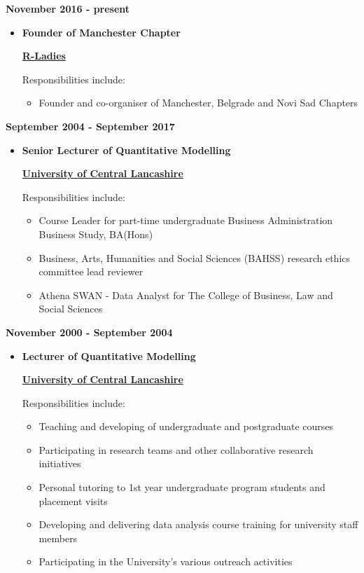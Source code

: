 \documentclass[
]{article}
\providecommand{\tightlist}{%
  \setlength{\itemsep}{0pt}\setlength{\parskip}{0pt}}
\begin{document}
\textbf{November 2016 - present}

\begin{itemize}
\item
  \textbf{Founder of Manchester Chapter}

  \href{https://rladies.org}{\textbf{R-Ladies}}

  Responsibilities include:

  \begin{itemize}
  \tightlist
  \item
    Founder and co-organiser of Manchester, Belgrade and Novi Sad
    Chapters
  \end{itemize}
\end{itemize}

\textbf{September 2004 - September 2017}

\begin{itemize}
\item
  \textbf{Senior Lecturer of Quantitative Modelling}

  \href{https://www.uclan.ac.uk}{\textbf{University of Central
  Lancashire}}

  Responsibilities include:

  \begin{itemize}
  \tightlist
  \item
    Course Leader for part-time undergraduate Business Administration
    Business Study, BA(Hons)
  \item
    Business, Arts, Humanities and Social Sciences (BAHSS) research
    ethics committee lead reviewer
  \item
    Athena SWAN - Data Analyst for The College of Business, Law and
    Social Sciences
  \end{itemize}
\end{itemize}

\textbf{November 2000 - September 2004}

\begin{itemize}
\item
  \textbf{Lecturer of Quantitative Modelling}

  \href{https://www.uclan.ac.uk}{\textbf{University of Central
  Lancashire}}

  Responsibilities include:

  \begin{itemize}
  \tightlist
  \item
    Teaching and developing of undergraduate and postgraduate courses
  \item
    Participating in research teams and other collaborative research
    initiatives
  \item
    Personal tutoring to 1st year undergraduate program students and
    placement visits
  \item
    Developing and delivering data analysis course training for
    university staff members
  \item
    Participating in the University's various outreach activities
  \end{itemize}
\end{itemize}
\end{document}
